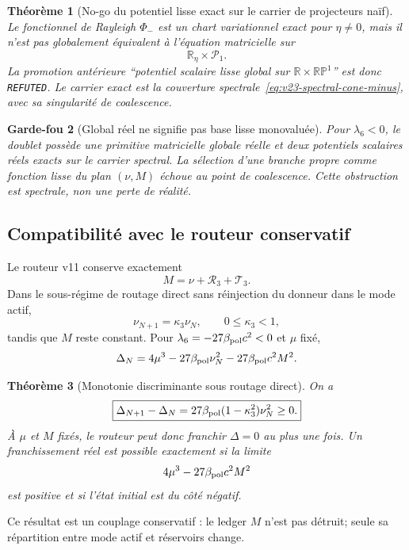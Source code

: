 \documentclass[11pt,a4paper]{article}
\newtheorem{theorem}{Théorème}[section]
\newtheorem{guardrail}[theorem]{Garde-fou}
\newcommand{\certRefuted}{\texttt{REFUTED}}
\begin{document}
\begin{theorem}[No-go du potentiel lisse exact sur le carrier de projecteurs naïf]\label{thm:v23-Rayleigh-global-nogo}
Le fonctionnel de Rayleigh $\Phi_-$ est un chart variationnel exact pour $\eta\neq0$, mais il n'est pas globalement équivalent à l'équation matricielle sur
\[
 \mathbb R_\eta\times\mathscr P_1.
\]
La promotion antérieure ``potentiel scalaire lisse global sur $\mathbb R\times\mathbb{RP}^1$'' est donc \certRefuted{}. Le carrier exact est la couverture spectrale~\eqref{eq:v23-spectral-cone-minus}, avec sa singularité de coalescence.
\end{theorem}

\begin{guardrail}[Global réel ne signifie pas base lisse monovaluée]
Pour $\lambda_6<0$, le doublet possède une primitive matricielle globale réelle et deux potentiels scalaires réels exacts sur le carrier spectral. La sélection d'une branche propre comme fonction lisse du plan $(\nu,M)$ échoue au point de coalescence. Cette obstruction est spectrale, non une perte de réalité.
\end{guardrail}

\subsection{Compatibilité avec le routeur conservatif}

Le routeur v11 conserve exactement
\[
 M=\nu+\mathscr R_3+\mathscr T_3.
\]
Dans le sous-régime de routage direct sans réinjection du donneur dans le mode actif,
\[
 \nu_{N+1}=\kappa_3\nu_N,
 \qquad 0\le\kappa_3<1,
\]
tandis que $M$ reste constant. Pour $\lambda_6=-27\beta_{\rm pol}c^2<0$ et $\mu$ fixé,
\[
 \Delta_N
 =4\mu^3-27\beta_{\rm pol}\nu_N^2-27\beta_{\rm pol}c^2M^2.
\]

\begin{theorem}[Monotonie discriminante sous routage direct]\label{thm:v23-router-discriminant}
On a
\[
 \boxed{
 \Delta_{N+1}-\Delta_N
 =27\beta_{\rm pol}(1-\kappa_3^2)\nu_N^2\ge0.}
\]
À $\mu$ et $M$ fixés, le routeur peut donc franchir $\Delta=0$ au plus une fois. Un franchissement réel est possible exactement si la limite
\[
 4\mu^3-27\beta_{\rm pol}c^2M^2
\]
est positive et si l'état initial est du côté négatif.
\end{theorem}

Ce résultat est un couplage conservatif : le ledger $M$ n'est pas détruit; seule sa répartition entre mode actif et réservoirs change.
\end{document}
